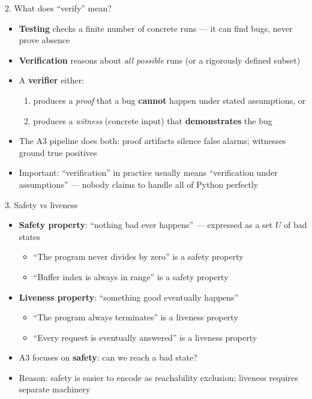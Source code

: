 \documentclass[aspectratio=169]{beamer}
\begin{document}
\begin{frame}{2. What does ``verify'' mean?}
\begin{itemize}
  \item \textbf{Testing} checks a finite number of concrete runs --- it can find bugs, never prove absence
  \item \textbf{Verification} reasons about \emph{all possible} runs (or a rigorously defined subset)
  \item A \textbf{verifier} either:
    \begin{enumerate}
      \item produces a \emph{proof} that a bug \textbf{cannot} happen under stated assumptions, or
      \item produces a \emph{witness} (concrete input) that \textbf{demonstrates} the bug
    \end{enumerate}
  \item The A3 pipeline does both: proof artifacts silence false alarms; witnesses ground true positives
  \item Important: ``verification'' in practice usually means ``verification under assumptions'' --- nobody claims to handle all of Python perfectly
\end{itemize}
\end{frame}

\begin{frame}{3. Safety vs liveness}
\begin{itemize}
  \item \textbf{Safety property}: ``nothing bad ever happens'' --- expressed as a set \(U\) of bad states
    \begin{itemize}
      \item ``The program never divides by zero'' is a safety property
      \item ``Buffer index is always in range'' is a safety property
    \end{itemize}
  \item \textbf{Liveness property}: ``something good eventually happens''
    \begin{itemize}
      \item ``The program always terminates'' is a liveness property
      \item ``Every request is eventually answered'' is a liveness property
    \end{itemize}
  \item A3 focuses on \textbf{safety}: can we reach a bad state?
  \item Reason: safety is easier to encode as reachability exclusion; liveness requires separate machinery
\end{itemize}
\end{frame}
\end{document}
